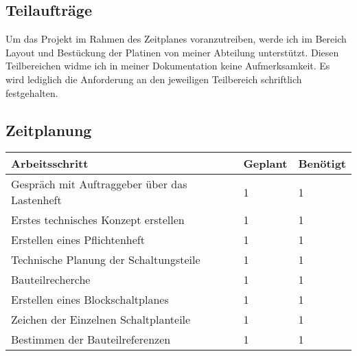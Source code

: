 \subsection{Teilaufträge}
Um das Projekt im Rahmen des Zeitplanes voranzutreiben, werde ich im Bereich Layout und Bestückung der Platinen von meiner Abteilung unterstützt. Diesen Teilbereichen widme ich in meiner Dokumentation keine Aufmerksamkeit. Es wird lediglich die Anforderung an den jeweiligen Teilbereich schriftlich festgehalten. 

\newpage

\renewcommand{\arraystretch}{2}
\subsection{Zeitplanung}

\begin{tabularx}{\textwidth}{p{}|  p{} | p{}}

\textbf{Arbeitsschritt} 	&	\textbf{Geplant}	&	\textbf{Benötigt}	\\

\hline

Gespräch mit Auftraggeber über das Lastenheft	&	1	&	1\\

\hline

Erstes technisches Konzept erstellen			&	1	&	1\\

\hline

Erstellen eines Pflichtenheft					&	1	&	1\\

\hline 

Technische Planung der Schaltungsteile			&	1	&	1\\

\hline 

Bauteilrecherche  								&	1	&	1\\

\hline

Erstellen eines Blockschaltplanes				&	1	&	1\\

\hline

Zeichen der Einzelnen Schaltplanteile			&	1	&	1\\

\hline 

Bestimmen der Bauteilreferenzen					&	1	&	1\\

\hline


\end{tabularx}
